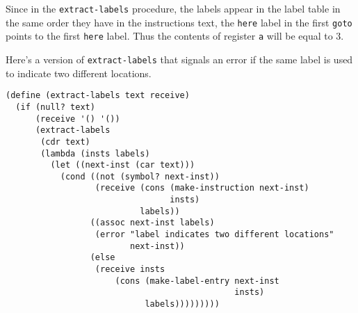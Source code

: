 \documentclass[a4paper,12pt]{article}
\begin{document}
Since in the \lstinline!extract-labels! procedure, the labels appear
in the label table in the same order they have in the instructions
text, the \lstinline!here!  label in the first \lstinline!goto! points
to the first \lstinline!here! label.  Thus the contents of register
\lstinline!a!  will be equal to $3$.

Here's a version of \lstinline!extract-labels! that signals an error
if the same label is used to indicate two different locations.

\begin{lstlisting}
(define (extract-labels text receive)
  (if (null? text)
      (receive '() '())
      (extract-labels
       (cdr text)
       (lambda (insts labels)
         (let ((next-inst (car text)))
           (cond ((not (symbol? next-inst))
                  (receive (cons (make-instruction next-inst)
                                 insts)
                           labels))
                 ((assoc next-inst labels)
                  (error "label indicates two different locations"
                         next-inst))
                 (else
                  (receive insts
                      (cons (make-label-entry next-inst
                                              insts)
                            labels)))))))))
\end{lstlisting}
\end{document}

